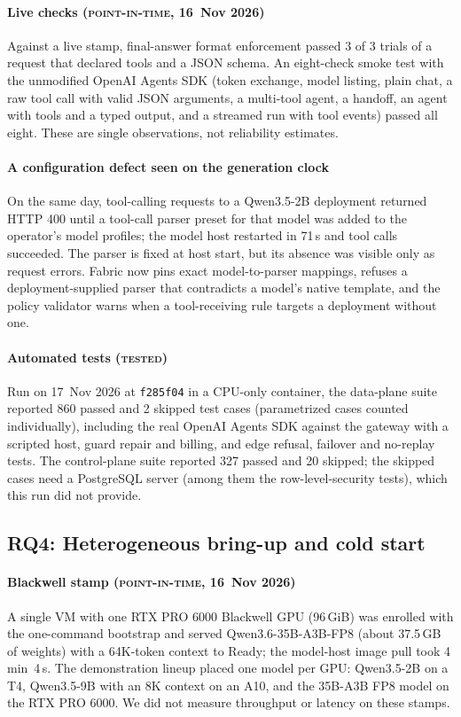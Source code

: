 \documentclass[conference,letterpaper]{IEEEtran}
\newcommand{\sys}{Fabric}
\newcommand{\code}[1]{\texttt{\small #1}}
\newcommand{\ev}[1]{{\normalfont\textsc{#1}}}
\newcommand{\PointInTime}{\ev{point-in-time}}
\newcommand{\Tested}{\ev{tested}}
\newcommand{\commit}{\code{f285f04}}
\begin{document}
\paragraph*{Live checks (\PointInTime{}, 16~Nov 2026)}
Against a live stamp, final-answer format enforcement passed 3 of 3 trials of a request that
declared tools and a JSON schema. An eight-check smoke test with the unmodified OpenAI Agents
SDK (token exchange, model listing, plain chat, a raw tool call with valid JSON arguments, a
multi-tool agent, a handoff, an agent with tools and a typed output, and a streamed run with
tool events) passed all eight. These are single observations, not reliability estimates.

\paragraph*{A configuration defect seen on the generation clock}
On the same day, tool-calling requests to a Qwen3.5-2B deployment returned HTTP 400 until a
tool-call parser preset for that model was added to the operator's model profiles; the model
host restarted in 71\,s and tool calls succeeded. The parser is fixed at host start, but its
absence was visible only as request errors. \sys{} now pins exact model-to-parser mappings,
refuses a deployment-supplied parser that contradicts a model's native template, and the policy
validator warns when a tool-receiving rule targets a deployment without one.

\paragraph*{Automated tests (\Tested{})}
Run on 17~Nov 2026 at \commit{} in a CPU-only container, the data-plane suite reported 860
passed and 2 skipped test cases (parametrized cases counted individually), including the real
OpenAI Agents SDK against the gateway with a scripted host, guard repair and billing, and edge
refusal, failover and no-replay tests. The control-plane suite reported 327 passed and 20 skipped; the skipped cases need a
PostgreSQL server (among them the row-level-security tests), which this run did not provide.

\subsection{RQ4: Heterogeneous bring-up and cold start}
\label{sec:eval-coldstart}

\paragraph*{Blackwell stamp (\PointInTime{}, 16~Nov 2026)}
A single VM with one RTX PRO 6000 Blackwell GPU (96\,GiB) was enrolled with the one-command
bootstrap and served Qwen3.6-35B-A3B-FP8 (about 37.5\,GB of weights) with a 64K-token context to
Ready; the model-host image pull took 4\,min~4\,s. The demonstration lineup placed one model per
GPU: Qwen3.5-2B on a T4, Qwen3.5-9B with an 8K context on an A10, and the 35B-A3B FP8 model on the
RTX PRO 6000. We did not measure throughput or latency on these stamps.
\end{document}
